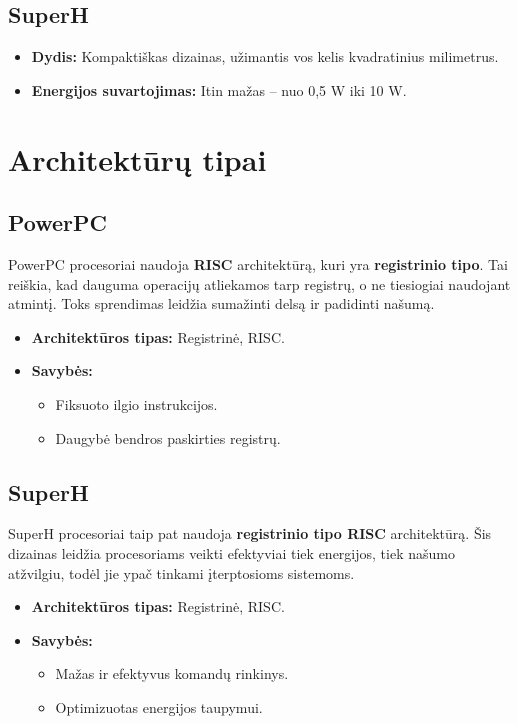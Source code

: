 \documentclass{article}
\begin{document}
\subsection{SuperH}
\begin{itemize}
    \item \textbf{Dydis:} Kompaktiškas dizainas, užimantis vos kelis kvadratinius milimetrus.
    \item \textbf{Energijos suvartojimas:} Itin mažas – nuo 0,5 W iki 10 W.
\end{itemize}

\section{Architektūrų tipai}
\subsection{PowerPC}
PowerPC procesoriai naudoja \textbf{RISC} architektūrą, kuri yra \textbf{registrinio tipo}. Tai reiškia, kad dauguma operacijų atliekamos tarp registrų, o ne tiesiogiai naudojant atmintį. Toks sprendimas leidžia sumažinti delsą ir padidinti našumą.

\begin{itemize}
    \item \textbf{Architektūros tipas:} Registrinė, RISC.
    \item \textbf{Savybės:}
        \begin{itemize}
            \item Fiksuoto ilgio instrukcijos.
            \item Daugybė bendros paskirties registrų.
        \end{itemize}
\end{itemize}

\subsection{SuperH}
SuperH procesoriai taip pat naudoja \textbf{registrinio tipo RISC} architektūrą. Šis dizainas leidžia procesoriams veikti efektyviai tiek energijos, tiek našumo atžvilgiu, todėl jie ypač tinkami įterptosioms sistemoms.

\begin{itemize}
    \item \textbf{Architektūros tipas:} Registrinė, RISC.
    \item \textbf{Savybės:}
        \begin{itemize}
            \item Mažas ir efektyvus komandų rinkinys.
            \item Optimizuotas energijos taupymui.
        \end{itemize}
\end{itemize}
\end{document}
